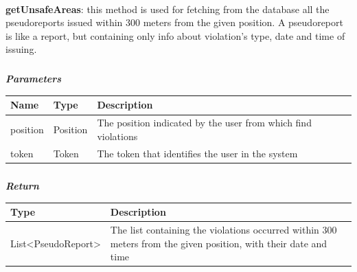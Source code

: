 					\paragraph{}
							\textbf{getUnsafeAreas}: this method is used for fetching from the database all the pseudoreports issued within 300 meters from the 
given position. A pseudoreport is like a report, but containing only info about violation's type, date and time of issuing. 
							\subparagraph{}
							\textit{\textbf{Parameters}}
								\begin{table}[!h]
									\begin{tabular}{L{0.2\textwidth}L{0.2\textwidth}L{0.2\textwidth}}
										\toprule
										Name & Type & Description \\
										\midrule
								  		position & Position & The position indicated by the user from which find violations \\
								  		token & Token & The token that identifies the user in the system \\
								 		\bottomrule
									\end{tabular}
								\end{table}
							\subparagraph{}
								\textit{\textbf{Return}}
									\begin{table}[!h]
									\begin{tabular}{L{0.3\textwidth}L{0.3\textwidth}}
										\toprule
										Type & Description \\
										\midrule
								  		List<PseudoReport> & The list containing the violations occurred within 300 meters from the given position, with their date and time \\
								 		\bottomrule
									\end{tabular}
								\end{table}
							
